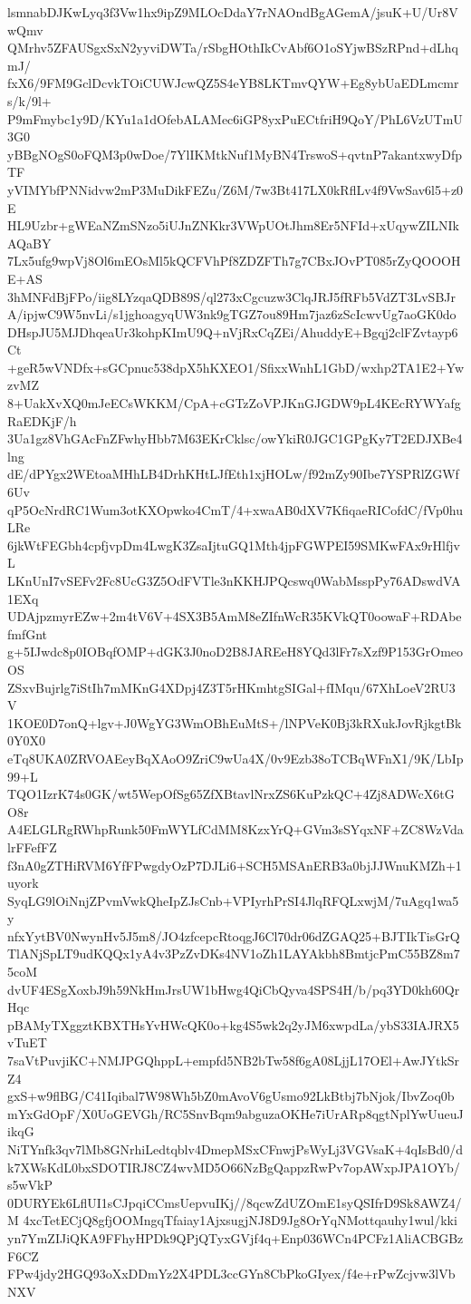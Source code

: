 lsmnabDJKwLyq3f3Vw1hx9ipZ9MLOcDdaY7rNAOndBgAGemA/jsuK+U/Ur8VwQmv
QMrhv5ZFAUSgxSxN2yyviDWTa/rSbgHOthIkCvAbf6O1oSYjwBSzRPnd+dLhqmJ/
fxX6/9FM9GclDcvkTOiCUWJcwQZ5S4eYB8LKTmvQYW+Eg8ybUaEDLmcmrs/k/9l+
P9mFmybc1y9D/KYu1a1dOfebALAMec6iGP8yxPuECtfriH9QoY/PhL6VzUTmU3G0
yBBgNOgS0oFQM3p0wDoe/7YlIKMtkNuf1MyBN4TrswoS+qvtnP7akantxwyDfpTF
yVIMYbfPNNidvw2mP3MuDikFEZu/Z6M/7w3Bt417LX0kRflLv4f9VwSav6l5+z0E
HL9Uzbr+gWEaNZmSNzo5iUJnZNKkr3VWpUOtJhm8Er5NFId+xUqywZILNIkAQaBY
7Lx5ufg9wpVj8Ol6mEOsMl5kQCFVhPf8ZDZFTh7g7CBxJOvPT085rZyQOOOHE+AS
3hMNFdBjFPo/iig8LYzqaQDB89S/ql273xCgcuzw3ClqJRJ5fRFb5VdZT3LvSBJr
A/ipjwC9W5nvLi/s1jghoagyqUW3nk9gTGZ7ou89Hm7jaz6zScIcwvUg7aoGK0do
DHspJU5MJDhqeaUr3kohpKImU9Q+nVjRxCqZEi/AhuddyE+Bgqj2clFZvtayp6Ct
+geR5wVNDfx+sGCpnuc538dpX5hKXEO1/SfixxWnhL1GbD/wxhp2TA1E2+YwzvMZ
8+UakXvXQ0mJeECsWKKM/CpA+cGTzZoVPJKnGJGDW9pL4KEcRYWYafgRaEDKjF/h
3Ua1gz8VhGAcFnZFwhyHbb7M63EKrCklsc/owYkiR0JGC1GPgKy7T2EDJXBe4lng
dE/dPYgx2WEtoaMHhLB4DrhKHtLJfEth1xjHOLw/f92mZy90Ibe7YSPRlZGWf6Uv
qP5OcNrdRC1Wum3otKXOpwko4CmT/4+xwaAB0dXV7KfiqaeRICofdC/fVp0huLRe
6jkWtFEGbh4cpfjvpDm4LwgK3ZsaIjtuGQ1Mth4jpFGWPEI59SMKwFAx9rHlfjvL
LKnUnI7vSEFv2Fc8UcG3Z5OdFVTle3nKKHJPQcswq0WabMsspPy76ADswdVA1EXq
UDAjpzmyrEZw+2m4tV6V+4SX3B5AmM8eZIfnWcR35KVkQT0oowaF+RDAbefmfGnt
g+5IJwdc8p0IOBqfOMP+dGK3J0noD2B8JAREeH8YQd3lFr7sXzf9P153GrOmeoOS
ZSxvBujrlg7iStIh7mMKnG4XDpj4Z3T5rHKmhtgSIGal+fIMqu/67XhLoeV2RU3V
1KOE0D7onQ+lgv+J0WgYG3WmOBhEuMtS+/lNPVeK0Bj3kRXukJovRjkgtBk0Y0X0
eTq8UKA0ZRVOAEeyBqXAoO9ZriC9wUa4X/0v9Ezb38oTCBqWFnX1/9K/LbIp99+L
TQO1IzrK74s0GK/wt5WepOfSg65ZfXBtavlNrxZS6KuPzkQC+4Zj8ADWcX6tGO8r
A4ELGLRgRWhpRunk50FmWYLfCdMM8KzxYrQ+GVm3sSYqxNF+ZC8WzVdalrFFefFZ
f3nA0gZTHiRVM6YfFPwgdyOzP7DJLi6+SCH5MSAnERB3a0bjJJWnuKMZh+1uyork
SyqLG9lOiNnjZPvmVwkQheIpZJsCnb+VPIyrhPrSI4JlqRFQLxwjM/7uAgq1wa5y
nfxYytBV0NwynHv5J5m8/JO4zfcepcRtoqgJ6Cl70dr06dZGAQ25+BJTIkTisGrQ
TlANjSpLT9udKQQx1yA4v3PzZvDKs4NV1oZh1LAYAkbh8BmtjcPmC55BZ8m75coM
dvUF4ESgXoxbJ9h59NkHmJrsUW1bHwg4QiCbQyva4SPS4H/b/pq3YD0kh60QrHqc
pBAMyTXggztKBXTHsYvHWcQK0o+kg4S5wk2q2yJM6xwpdLa/ybS33IAJRX5vTuET
7saVtPuvjiKC+NMJPGQhppL+empfd5NB2bTw58f6gA08LjjL17OEl+AwJYtkSrZ4
gxS+w9flBG/C41Iqibal7W98Wh5bZ0mAvoV6gUsmo92LkBtbj7bNjok/IbvZoq0b
mYxGdOpF/X0UoGEVGh/RC5SnvBqm9abguzaOKHe7iUrARp8qgtNplYwUueuJikqG
NiTYnfk3qv7lMb8GNrhiLedtqblv4DmepMSxCFnwjPsWyLj3VGVsaK+4qIsBd0/d
k7XWsKdL0bxSDOTIRJ8CZ4wvMD5O66NzBgQappzRwPv7opAWxpJPA1OYb/s5wVkP
0DURYEk6LflUI1sCJpqiCCmsUepvuIKj//8qcwZdUZOmE1syQSIfrD9Sk8AWZ4/M
4xcTetECjQ8gfjOOMngqTfaiay1AjxsugjNJ8D9Jg8OrYqNMottqauhy1wul/kki
yn7YmZIJiQKA9FFhyHPDk9QPjQTyxGVjf4q+Enp036WCn4PCFz1AliACBGBzF6CZ
FPw4jdy2HGQ93oXxDDmYz2X4PDL3ccGYn8CbPkoGIyex/f4e+rPwZcjvw3lVbNXV
